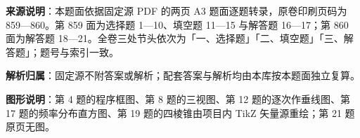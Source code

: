 

\begin{gknotice}
\textbf{来源说明}：本题面依据固定源 PDF 的两页 A3 题面逐题转录，原卷印刷页码为 859—860。第 859 面为选择题 1—10、填空题 11—15 与解答题 16—17；第 860 面为解答题 18—21。全卷三处节头依次为「一、选择题」「二、填空题」「三、解答题」；题号与索引一致。

\textbf{解析归属}：固定源不附答案或解析；配套答案与解析均由本库按本题面独立复算。

\textbf{图形说明}：第 4 题的程序框图、第 8 题的三视图、第 12 题的逐次作垂线图、第 17 题的频率分布直方图、第 19 题的四棱锥由项目内 TikZ 矢量源重绘；第 21 题原页无图。
\end{gknotice}


